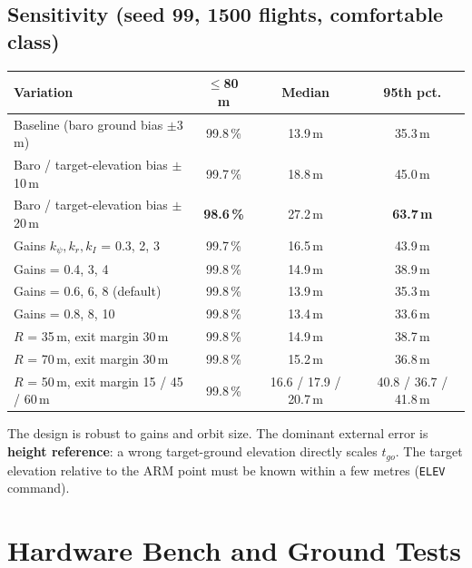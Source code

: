 \documentclass[11pt,a4paper]{article}
\newcommand{\warn}[1]{\textcolor{warnamber}{\textbf{#1}}}
\newcommand{\code}[1]{\texttt{#1}}
\begin{document}
\subsection{Sensitivity (seed 99, 1500 flights, comfortable class)}
\begin{center}
\small
\renewcommand{\arraystretch}{1.15}
\begin{tabular}{lccc}
\toprule
\textbf{Variation} & \textbf{$\le$80\,m} & \textbf{Median} & \textbf{95th pct.} \\
\midrule
Baseline (baro ground bias $\pm$3\,m) & 99.8\,\% & 13.9\,m & 35.3\,m \\
Baro / target-elevation bias $\pm$10\,m & 99.7\,\% & 18.8\,m & 45.0\,m \\
Baro / target-elevation bias $\pm$20\,m & \warn{98.6\,\%} & 27.2\,m & \warn{63.7\,m} \\
\midrule
Gains $k_\psi, k_r, k_I$ = 0.3, 2, 3 & 99.7\,\% & 16.5\,m & 43.9\,m \\
Gains = 0.4, 3, 4 & 99.8\,\% & 14.9\,m & 38.9\,m \\
Gains = 0.6, 6, 8 (default) & 99.8\,\% & 13.9\,m & 35.3\,m \\
Gains = 0.8, 8, 10 & 99.8\,\% & 13.4\,m & 33.6\,m \\
\midrule
$R$ = 35\,m, exit margin 30\,m & 99.8\,\% & 14.9\,m & 38.7\,m \\
$R$ = 70\,m, exit margin 30\,m & 99.8\,\% & 15.2\,m & 36.8\,m \\
$R$ = 50\,m, exit margin 15 / 45 / 60\,m & 99.8\,\% & 16.6 / 17.9 / 20.7\,m & 40.8 / 36.7 / 41.8\,m \\
\bottomrule
\end{tabular}
\end{center}
The design is robust to gains and orbit size. The dominant external error is
\textbf{height reference}: a wrong target-ground elevation directly scales
$t_{go}$. The target elevation relative to the ARM point must be known within
a few metres (\code{ELEV} command).

\section{Hardware Bench and Ground Tests}
\end{document}
